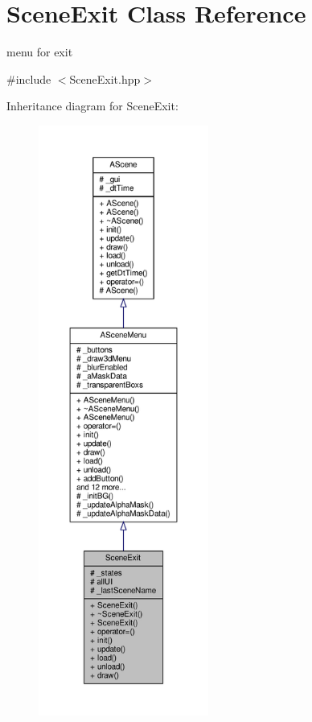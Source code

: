 \hypertarget{class_scene_exit}{}\section{Scene\+Exit Class Reference}
\label{class_scene_exit}


menu for exit  




{\ttfamily \#include $<$Scene\+Exit.\+hpp$>$}



Inheritance diagram for Scene\+Exit\+:
\nopagebreak
\begin{figure}[H]
\begin{center}
\leavevmode
\includegraphics[height=550pt]{class_scene_exit__inherit__graph}
\end{center}
\end{figure}


